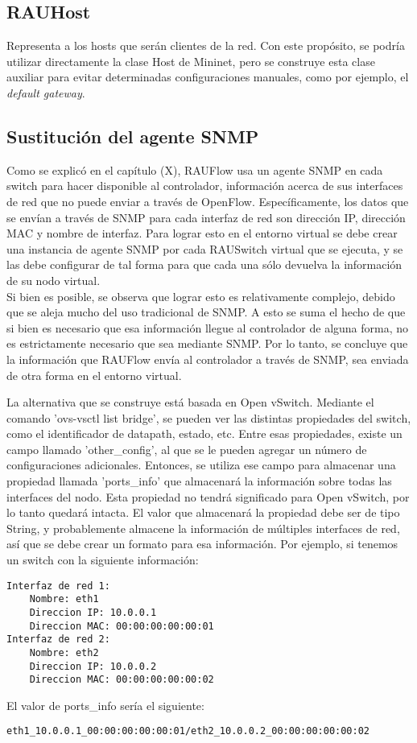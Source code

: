 \subsection{RAUHost}
Representa a los hosts que serán clientes de la red. Con este propósito, se podría utilizar directamente la clase Host de Mininet, pero se construye esta clase auxiliar para evitar determinadas configuraciones manuales, como por ejemplo, el \textit{default gateway}.

\subsection{Sustitución del agente SNMP}
Como se explicó en el capítulo (X), RAUFlow usa un agente SNMP en cada switch para hacer disponible al controlador, información acerca de sus interfaces de red que no puede enviar a través de OpenFlow. Específicamente, los datos que se envían a través de SNMP para cada interfaz de red son dirección IP, dirección MAC y nombre de interfaz. Para lograr esto en el entorno virtual se debe crear una instancia de agente SNMP por cada RAUSwitch virtual que se ejecuta, y se las debe configurar de tal forma para que cada una sólo devuelva la información de su nodo virtual. \\
Si bien es posible, se observa que lograr esto es relativamente complejo, debido que se aleja mucho del uso tradicional de SNMP. A esto se suma el hecho de que si bien es necesario que esa información llegue al controlador de alguna forma, no es estrictamente necesario que sea mediante SNMP. Por lo tanto, se concluye que la información que RAUFlow envía al controlador a través de SNMP, sea enviada de otra forma en el entorno virtual.

La alternativa que se construye está basada en Open vSwitch. Mediante el comando 'ovs-vsctl list bridge', se pueden ver las distintas propiedades del switch, como el identificador de datapath, estado, etc. Entre esas propiedades, existe un campo llamado 'other\_config', al que se le pueden agregar un número de configuraciones adicionales. Entonces, se utiliza ese campo para almacenar una propiedad llamada 'ports\_info' que almacenará la información sobre todas las interfaces del nodo. Esta propiedad no tendrá significado para Open vSwitch, por lo tanto quedará intacta. El valor que almacenará la propiedad debe ser de tipo String, y probablemente almacene la información de múltiples interfaces de red, así que se debe crear un formato para esa información. Por ejemplo, si tenemos un switch con la siguiente información:
\begin{lstlisting}
Interfaz de red 1:
	Nombre: eth1
	Direccion IP: 10.0.0.1
	Direccion MAC: 00:00:00:00:00:01
Interfaz de red 2:
	Nombre: eth2
	Direccion IP: 10.0.0.2
	Direccion MAC: 00:00:00:00:00:02
\end{lstlisting}
El valor de ports\_info sería el siguiente:
\begin{lstlisting}
eth1_10.0.0.1_00:00:00:00:00:01/eth2_10.0.0.2_00:00:00:00:00:02
\end{lstlisting}

